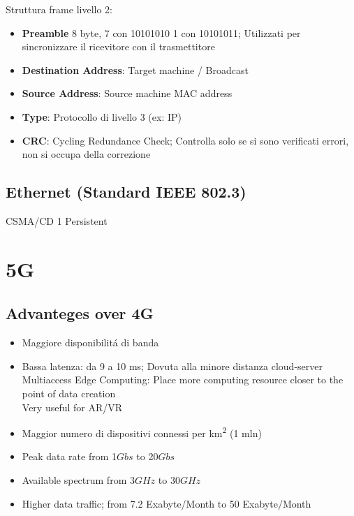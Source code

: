 \documentclass{article}
\begin{document}
Struttura frame livello 2:
\begin{itemize}
    \item \textbf{Preamble} 8 byte, 7 con 10101010 1 con 10101011; Utilizzati per sincronizzare il ricevitore con il trasmettitore
    \item \textbf{Destination Address}: Target machine / Broadcast
    \item \textbf{Source Address}: Source machine MAC address
    \item \textbf{Type}: Protocollo di livello 3 (ex: IP)
    \item \textbf{CRC}: Cycling Redundance Check; Controlla solo se si sono verificati errori, non si occupa della correzione
\end{itemize}

\subsection{Ethernet (Standard IEEE 802.3)}

CSMA/CD 1 Persistent

\newpage

\section{5G}

\subsection{Advanteges over 4G}

\begin{itemize}
    \item Maggiore disponibilit\'a di banda
    \item Bassa latenza: da 9 a 10 ms; Dovuta alla minore distanza cloud-server\\
        Multiaccess Edge Computing: Place more computing resource closer to the point of data creation\\
        Very useful for AR/VR

    \item Maggior numero di dispositivi connessi per km\textsuperscript{2} (1 mln)
    \item Peak data rate from 1\(Gbs\) to 20\(Gbs\)
    \item Available spectrum from 3\(GHz\) to 30\(GHz\)
    \item Higher data traffic; from 7.2 Exabyte/Month to 50 Exabyte/Month

\end{itemize}
\end{document}
